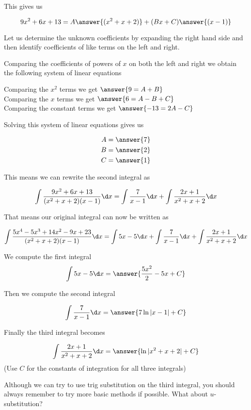 \documentclass{ximera}
\begin{document}
\begin{exercise}
\begin{exercise}
\begin{exercise}
This gives us 

\[
9x^{2}+6x+13=A\answer{(x^{2}+x+2)} + (Bx+C)\answer{(x-1)}
\]

Let us determine the unknown coefficients by expanding the right hand side and then identify coefficients of like terms on the left and right.



Comparing the coefficients of powers of $x$ on both the left and right we obtain the following system of linear equations


Comparing the $x^{2}$ terms we get $\answer {9=A+B}$ \\
Comparing the $x$ terms we get $\answer{6=A-B+C}$ \\
Comparing the constant terms we get $\answer{-13=2A-C}$ 

\begin{exercise}
Solving this system of linear equations gives us

\begin{align}
A&=\answer{  7 }\\
B&=\answer{2  }\\
C&=\answer{  1 }
\end{align}





\begin{exercise}
This means we can  rewrite the second integral as

\[
\int \frac{9x^{2}+6x+13}{(x^{2}+x+2)(x-1)} \d x= \int \frac{7}{x-1} \d x + \int \frac{2x+1}{x^{2}+x+2} \d x
\]

 That means our original integral can now be written as 

\[
\int \frac{5x^{4}-5x^{3}+14x^{2}-9x+23}{(x^{2}+x+2)(x-1)} \d x= \int 5x-5 \d x + \int \frac{7}{x-1} \d x +
\int \frac{2x+1}{x^{2}+x+2} \d x 
\]

We compute the first integral 
\[
\int 5x-5 \d x =\answer{ \frac{5x^{2}}{2} - 5x +C }
\]

Then we compute the second integral 

\[
\int \frac{7}{x-1} \d x= \answer{ 7\ln|x-1|+C }
\]

Finally the third integral becomes 

\[
\int \frac{2x+1}{x^{2}+x+2} \d x=\answer{ \ln| x^{2}+x+2 | + C}
\]
(Use $C$ for the constants of integration for all three integrals)

\begin{hint}
Although we can try to use trig substitution on the third integral, you should always remember to try more basic
methods if possible. What about $u$-substitution?
\end{hint}


\end{exercise}
\end{exercise}
\end{exercise}
\end{exercise}
\end{exercise}
\end{document}
